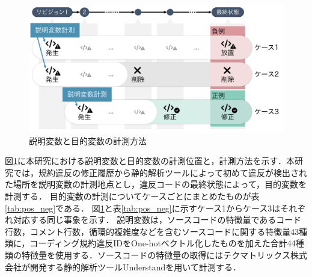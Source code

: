 \documentclass[paper]{ieicej}
\begin{document}
\begin{figure}[t]
	\centering
	\includegraphics[width=1.0\linewidth]{fig/kameoka_fig2.pdf}
	\caption{説明変数と目的変数の計測方法}
	\label{fig:mokutekihensu}
\end{figure}

図\ref{fig:mokutekihensu}に本研究における説明変数と目的変数の計測位置と，計測方法を示す．本研究では，規約違反の修正履歴から静的解析ツールによって初めて違反が検出された場所を説明変数の計測地点とし，違反コードの最終状態によって，目的変数を計測する．
目的変数の計測についてケースごとにまとめたものが表\ref{tab:pos_neg}である．
図\ref{fig:mokutekihensu}と表\ref{tab:pos_neg}に示すケース1からケース3はそれぞれ対応する同じ事象を示す．
説明変数は，ソースコードの特徴量であるコード行数，コメント行数，循環的複雑度などを含むソースコードに関する特徴量43種類に，コーディング規約違反IDをOne-hotベクトル化したものを加えた合計44種類の特徴量を使用する．ソースコードの特徴量の取得にはテクマトリックス株式会社が開発する静的解析ツールUnderstandを用いて計測する．

\begin{table}[t]
    \centering
    \caption{正例と負例の分類}
    \label{tab:pos_neg}
\end{table}
\end{document}
